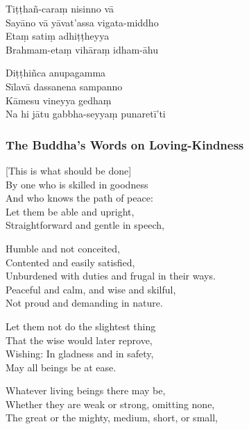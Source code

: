 \begin{paritta}
Tiṭṭhañ-caraṃ nisinno vā\\
Sayāno vā yāvat'assa vigata-middho\\
Etaṃ satiṃ adhiṭṭheyya\\
Brahmam-etaṃ vihāraṃ idham-āhu

Diṭṭhiñca anupagamma\\
Sīlavā dassanena sampanno\\
Kāmesu vineyya gedhaṃ\\
Na hi jātu gabbha-seyyaṃ punaretī'ti


\end{paritta}

\clearpage

\subsubsection{The Buddha's Words on Loving-Kindness}

\begin{leader}
\end{leader}


[This is what should be done]\\
By one who is skilled in goodness\\
And who knows the path of peace:\\
Let them be able and upright,\\
Straightforward and gentle in speech,

Humble and not conceited,\\
Contented and easily satisfied,\\
Unburdened with duties and frugal in their ways.\\
Peaceful and calm, and wise and skilful,\\
Not proud and demanding in nature.

Let them not do the slightest thing\\
That the wise would later reprove,\\
Wishing: In gladness and in safety,\\
May all beings be at ease.

Whatever living beings there may be,\\
Whether they are weak or strong, omitting none,\\
The great or the mighty, medium, short, or small,

